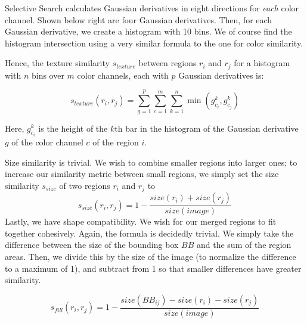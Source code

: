 \documentclass{article}
\begin{document}
Selective Search calculates Gaussian derivatives in eight directions for \textit{each} color channel. Shown below right are four Gaussian derivatives. Then, for each Gaussian derivative, we create a histogram with 10 bins. We of course find the histogram intersection using a very similar formula to the one for color similarity.

Hence, the texture similarity $s_{texture}$ between regions $r_i$ and $r_j$ for a histogram with $n$ bins over $m$ color channels, each with $p$ Gaussian derivatives is:

\[s_{texture}(r_i, r_j) = \sum_{g=1}^p\sum_{c=1}^m\sum_{k=1}^n \min(g_{c_i}^k, g_{c_j}^k)\]

Here, $g_{c_i}^k$ is the height of the $k$th bar in the histogram of the Gaussian derivative $g$ of the color channel $c$ of the region $i$.

Size similarity is trivial. We wish to combine smaller regions into larger ones; to increase our similarity metric between small regions, we simply set the size similarity $s_{size}$ of two regions $r_i$ and $r_j$ to
\[s_{size}(r_i, r_j) = 1 - \frac{size(r_i) + size(r_j)}{size(image)}\]
Lastly, we have shape compatibility. We wish for our merged regions to fit together cohesively. Again, the formula is decidedly trivial. We simply take the difference between the size of the bounding box $BB$ and the sum of the region areas. Then, we divide this by the size of the image (to normalize the difference to a maximum of 1), and subtract from 1 so that smaller differences have greater similarity.

\[s_{fill}(r_i, r_j) = 1 - \frac{size(BB_{ij}) - size(r_i) - size(r_j)}{size(image)}\]
\end{document}
